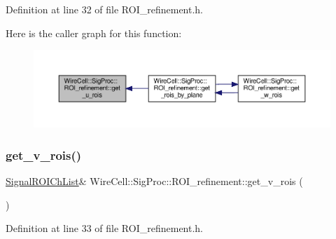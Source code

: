 Definition at line 32 of file R\+O\+I\+\_\+refinement.\+h.

Here is the caller graph for this function\+:
\nopagebreak
\begin{figure}[H]
\begin{center}
\leavevmode
\includegraphics[width=350pt]{class_wire_cell_1_1_sig_proc_1_1_r_o_i__refinement_a9b1debf14ee8bae2c9a558da5308cfb3_icgraph}
\end{center}
\end{figure}
\mbox{\label{class_wire_cell_1_1_sig_proc_1_1_r_o_i__refinement_abd0825bd27e31785fd255c90fab25df6}} 
\subsubsection{\texorpdfstring{get\+\_\+v\+\_\+rois()}{get\_v\_rois()}}
{\footnotesize\ttfamily \hyperlink{namespace_wire_cell_1_1_sig_proc_a5b3db127bb7fb1e16d93fa60f52905af}{Signal\+R\+O\+I\+Ch\+List}\& Wire\+Cell\+::\+Sig\+Proc\+::\+R\+O\+I\+\_\+refinement\+::get\+\_\+v\+\_\+rois (\begin{DoxyParamCaption}{ }\end{DoxyParamCaption})\hspace{0.3cm}{\ttfamily [inline]}}



Definition at line 33 of file R\+O\+I\+\_\+refinement.\+h.

